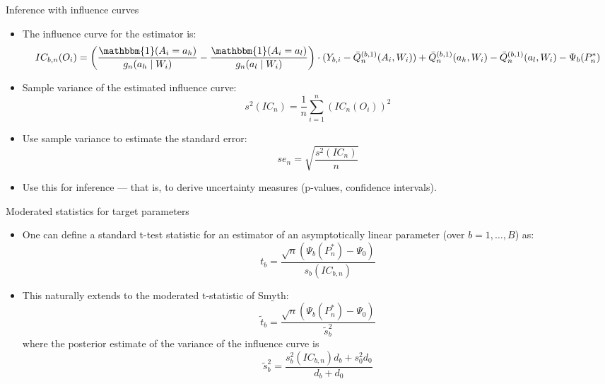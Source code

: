 \documentclass[12pt,t]{beamer}
\begin{document}
\begin{frame}[c]{Inference with influence curves}

\begin{center}
\begin{itemize}
  \itemsep12pt
  \item The influence curve for the estimator is:
  \begin{dmath}
    IC_{b,n}(O_i) = \left (\frac{\mathbbm{1}(A_i = a_{h})}{g_n(a_{h} \mid W_i)}
    - \frac{\mathbbm{1}(A_i = a_{l})}{g_n (a_{l} \mid W_i)} \right) \cdot
    (Y_{b,i} - \bar{Q}^{(b,1)}_n(A_i, W_i)) +
    \bar{Q}^{(b,1)}_n(a_{h}, W_i) - \bar{Q}^{(b,1)}_n(a_{l}, W_i) -
    \Psi_{b}(P_n^*)
  \end{dmath}
  \item Sample variance of the estimated influence curve:
    \[
      \textstyle s^2(IC_n) = \frac{1}{n}\sum_{i=1}^n\left(IC_n(O_i) \right)^2
    \]
  \item Use sample variance to estimate the standard error:
    \[
      se_n = \sqrt{\frac{s^2(IC_n)}{n}}
    \]
  \item Use this for inference --- that is, to derive uncertainty measures
    (p-values, confidence intervals).
\end{itemize}
\end{center}

\end{frame}



\begin{frame}[c]{Moderated statistics for target parameters}

\begin{center}
\begin{itemize}
  \itemsep12pt
  \item One can define a standard t-test statistic for an estimator of an
    asymptotically linear parameter (over $b = 1, \dots, B$) as:
    \[
      t_b = \frac{\sqrt{n}(\Psi_b(P_n^*) - \Psi_0)}{s_b(IC_{b,n})}
    \]
  \item This naturally extends to the moderated t-statistic of Smyth:
    \[
      \tilde{t}_b = \frac{\sqrt{n}(\Psi_b(P_n^*) - \Psi_0)}{\tilde{s}_b^2}
    \]
    where the posterior estimate of the variance of the influence curve is
    \[
      \tilde{s}^2_b = \frac{s^2_b(IC_{b,n})d_b + s^2_0d_0}{d_b + d_0}
    \]
\end{itemize}
\end{center}

\end{frame}
\end{document}
